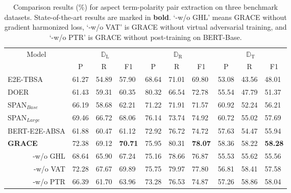 \documentclass[11pt,a4paper]{article}
\begin{document}
\begin{table*}[tp]
    \centering
    \begin{tabular}{|p{3.0cm}|p{0.9cm}<{\centering}p{0.9cm}<{\centering}p{0.95cm}<{\centering}|p{0.9cm}<{\centering}p{0.9cm}<{\centering}p{0.95cm}<{\centering}|p{0.9cm}<{\centering}p{0.9cm}<{\centering}p{0.95cm}<{\centering}|}
    \hline
    \multicolumn{1}{|c|}{\multirow{2}{*}{Model}} & \multicolumn{3}{c|}{$\mathbb{D}_\text{L}$}                              & \multicolumn{3}{c|}{$\mathbb{D}_\text{R}$}                              & \multicolumn{3}{c|}{$\mathbb{D}_\text{T}$}                              \\ \cline{2-10} 
    \multicolumn{1}{|c|}{}                       & \multicolumn{1}{c}{P} & \multicolumn{1}{c}{R} & \multicolumn{1}{c|}{F1} & \multicolumn{1}{c}{P} & \multicolumn{1}{c}{R} & \multicolumn{1}{c|}{F1} & \multicolumn{1}{c}{P} & \multicolumn{1}{c}{R} & \multicolumn{1}{c|}{F1} \\ \hline \hline
    E2E-TBSA            & 61.27 & 54.89 & 57.90 & 68.64 & 71.01 & 69.80 & 53.08 & 43.56 & 48.01 \\
    DOER & 61.43 & 59.31 & 60.35 & 80.32 & 66.54 & 72.78 & 55.54 & 47.79 & 51.37 \\ 
    SPAN$_{Base}$       & 66.19 & 58.68 & 62.21 & 71.22 & 71.91 & 71.57 & 60.92 & 52.24 & 56.21 \\ 
    SPAN$_{Large}$      & 69.46 & 66.72 & 68.06 & 76.14 & 73.74 & 74.92 & 60.72 & 55.02 & 57.69 \\
    BERT-E2E-ABSA       & 61.88 & 60.47 & 61.12 & 72.92 & 76.72 & 74.72 & 57.63 & 54.47 & 55.94 \\ 
    \hline
    \textbf{GRACE} & 72.38 & 69.12 & \textbf{70.71} & 75.95 & 80.31 & \textbf{78.07} & 58.36 & 58.22 & \textbf{58.28} \\ 
    \multicolumn{1}{|r|}{-w/o GHL} & 68.64 & 65.90 & 67.24 & 75.16 & 78.66 & 76.87 & 55.53 & 55.62 & 55.56 \\ 
    \multicolumn{1}{|r|}{-w/o VAT} & 72.28 & 67.67 & 69.89 & 75.75 & 79.97 & 77.80 & 56.81 & 58.41 & 57.58  \\ 
    \multicolumn{1}{|r|}{-w/o PTR} & 66.39 & 61.70 & 63.96 & 73.28 & 76.53 & 74.87 & 57.26 & 58.86 & 58.04 \\ 
    \hline
    \end{tabular}
    \caption{Comparison results (\%) for aspect term-polarity pair extraction on three benchmark datasets. State-of-the-art results are marked in \textbf{bold}. `-w/o GHL' means GRACE without gradient harmonized loss, `-w/o VAT' is GRACE without virtual adversarial training, and `-w/o PTR' is GRACE without post-training on BERT-Base.}
    \label{tab_main_results}
\end{table*}
\end{document}
